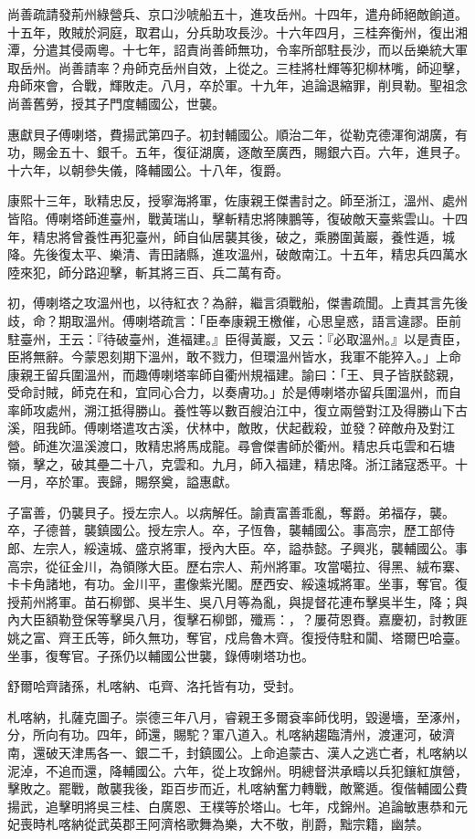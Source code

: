 \begin{pinyinscope}
尚善疏請發荊州綠營兵、京口沙唬船五十，進攻岳州。十四年，遣舟師絕敵餉道。十五年，敗賊於洞庭，取君山，分兵助攻長沙。十六年四月，三桂奔衡州，復出湘潭，分遣其侵兩粵。十七年，詔責尚善師無功，令率所部駐長沙，而以岳樂統大軍取岳州。尚善請率？舟師克岳州自效，上從之。三桂將杜輝等犯柳林嘴，師迎擊，舟師來會，合戰，輝敗走。八月，卒於軍。十九年，追論退縮罪，削貝勒。聖祖念尚善舊勞，授其子門度輔國公，世襲。

惠獻貝子傅喇塔，費揚武第四子。初封輔國公。順治二年，從勒克德渾徇湖廣，有功，賜金五十、銀千。五年，復征湖廣，逐敵至廣西，賜銀六百。六年，進貝子。十六年，以朝參失儀，降輔國公。十八年，復爵。

康熙十三年，耿精忠反，授寧海將軍，佐康親王傑書討之。師至浙江，溫州、處州皆陷。傅喇塔師進臺州，戰黃瑞山，擊斬精忠將陳鵬等，復破敵天臺紫雲山。十四年，精忠將曾養性再犯臺州，師自仙居襲其後，破之，乘勝圍黃巖，養性遁，城降。先後復太平、樂清、青田諸縣，進攻溫州，破敵南江。十五年，精忠兵四萬水陸來犯，師分路迎擊，斬其將三百、兵二萬有奇。

初，傅喇塔之攻溫州也，以待紅衣？為辭，繼言須戰船，傑書疏聞。上責其言先後歧，命？期取溫州。傅喇塔疏言：「臣奉康親王檄催，心思皇惑，語言違謬。臣前駐臺州，王云：『待破臺州，進福建。』臣得黃巖，又云：『必取溫州。』以是責臣，臣將無辭。今蒙恩刻期下溫州，敢不戮力，但環溫州皆水，我軍不能猝入。」上命康親王留兵圍溫州，而趣傅喇塔率師自衢州規福建。諭曰：「王、貝子皆朕懿親，受命討賊，師克在和，宜同心合力，以奏膚功。」於是傅喇塔亦留兵圍溫州，而自率師攻處州，溯江抵得勝山。養性等以數百艘泊江中，復立兩營對江及得勝山下古溪，阻我師。傅喇塔遣攻古溪，伏林中，敵敗，伏起截殺，並發？碎敵舟及對江營。師進次溫溪渡口，敗精忠將馬成龍。尋會傑書師於衢州。精忠兵屯雲和石塘嶺，擊之，破其壘二十八，克雲和。九月，師入福建，精忠降。浙江諸寇悉平。十一月，卒於軍。喪歸，賜祭奠，謚惠獻。

子富善，仍襲貝子。授左宗人。以病解任。諭責富善乖亂，奪爵。弟福存，襲。卒，子德普，襲鎮國公。授左宗人。卒，子恆魯，襲輔國公。事高宗，歷工部侍郎、左宗人，綏遠城、盛京將軍，授內大臣。卒，謚恭懿。子興兆，襲輔國公。事高宗，從征金川，為領隊大臣。歷右宗人、荊州將軍。攻當噶拉、得黑、絨布寨、卡卡角諸地，有功。金川平，畫像紫光閣。歷西安、綏遠城將軍。坐事，奪官。復授荊州將軍。苗石柳鄧、吳半生、吳八月等為亂，與提督花連布擊吳半生，降；與內大臣額勒登保等擊吳八月，復擊石柳鄧，殲焉：，？屢荷恩賚。嘉慶初，討教匪姚之富、齊王氏等，師久無功，奪官，戍烏魯木齊。復授侍駐和闐、塔爾巴哈臺。坐事，復奪官。子孫仍以輔國公世襲，錄傅喇塔功也。

舒爾哈齊諸孫，札喀納、屯齊、洛托皆有功，受封。

札喀納，扎薩克圖子。崇德三年八月，睿親王多爾袞率師伐明，毀邊墻，至涿州，分，所向有功。四年，師還，賜駝？軍八道入。札喀納趨臨清州，渡運河，破濟南，還破天津馬各一、銀二千，封鎮國公。上命追蒙古、漢人之逃亡者，札喀納以泥淖，不追而還，降輔國公。六年，從上攻錦州。明總督洪承疇以兵犯鑲紅旗營，擊敗之。罷戰，敵襲我後，距百步而近，札喀納奮力轉戰，敵驚遁。復偕輔國公費揚武，追擊明將吳三桂、白廣恩、王樸等於塔山。七年，戍錦州。追論敏惠恭和元妃喪時札喀納從武英郡王阿濟格歌舞為樂，大不敬，削爵，黜宗籍，幽禁。


\end{pinyinscope}
